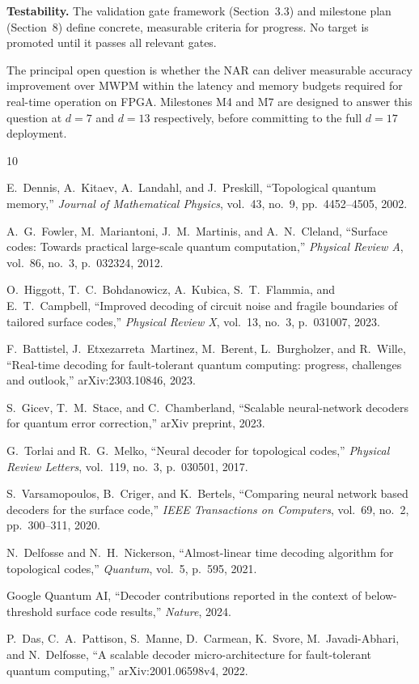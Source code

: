 \documentclass[conference]{IEEEtran}
\begin{document}
\textbf{Testability.} The validation gate framework (Section~3.3) and milestone plan (Section~8) define concrete, measurable criteria for progress. No target is promoted until it passes all relevant gates.

The principal open question is whether the NAR can deliver measurable accuracy improvement over MWPM within the latency and memory budgets required for real-time operation on FPGA. Milestones M4 and M7 are designed to answer this question at $d = 7$ and $d = 13$ respectively, before committing to the full $d = 17$ deployment.

\begin{thebibliography}{10}

E.~Dennis, A.~Kitaev, A.~Landahl, and J.~Preskill, ``Topological quantum memory,'' \emph{Journal of Mathematical Physics}, vol.~43, no.~9, pp.~4452--4505, 2002.

A.~G.~Fowler, M.~Mariantoni, J.~M.~Martinis, and A.~N.~Cleland, ``Surface codes: Towards practical large-scale quantum computation,'' \emph{Physical Review A}, vol.~86, no.~3, p.~032324, 2012.

O.~Higgott, T.~C.~Bohdanowicz, A.~Kubica, S.~T.~Flammia, and E.~T.~Campbell, ``Improved decoding of circuit noise and fragile boundaries of tailored surface codes,'' \emph{Physical Review X}, vol.~13, no.~3, p.~031007, 2023.

F.~Battistel, J.~Etxezarreta~Martinez, M.~Berent, L.~Burgholzer, and R.~Wille, ``Real-time decoding for fault-tolerant quantum computing: progress, challenges and outlook,'' arXiv:2303.10846, 2023.

S.~Gicev, T.~M.~Stace, and C.~Chamberland, ``Scalable neural-network decoders for quantum error correction,'' arXiv preprint, 2023.

G.~Torlai and R.~G.~Melko, ``Neural decoder for topological codes,'' \emph{Physical Review Letters}, vol.~119, no.~3, p.~030501, 2017.

S.~Varsamopoulos, B.~Criger, and K.~Bertels, ``Comparing neural network based decoders for the surface code,'' \emph{IEEE Transactions on Computers}, vol.~69, no.~2, pp.~300--311, 2020.

N.~Delfosse and N.~H.~Nickerson, ``Almost-linear time decoding algorithm for topological codes,'' \emph{Quantum}, vol.~5, p.~595, 2021.

Google Quantum AI, ``Decoder contributions reported in the context of below-threshold surface code results,'' \emph{Nature}, 2024.

P.~Das, C.~A.~Pattison, S.~Manne, D.~Carmean, K.~Svore, M.~Javadi-Abhari, and N.~Delfosse, ``A scalable decoder micro-architecture for fault-tolerant quantum computing,'' arXiv:2001.06598v4, 2022.

\end{thebibliography}
\end{document}
